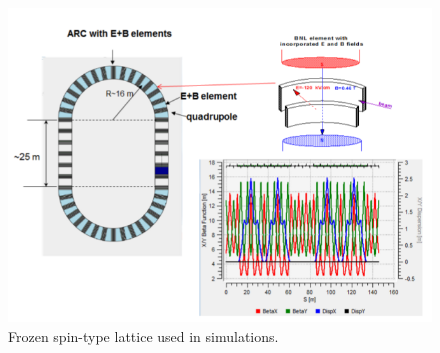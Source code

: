 \documentclass[a4paper]{jacow}
\begin{document}
\begin{figure}[h!]
  \centering
  \includegraphics[width=\linewidth]{../img/Lattice/BNL}
  \caption{Frozen spin-type lattice used in simulations.\label{fig:FSBNL_lattice}}
\end{figure}
\end{document}
